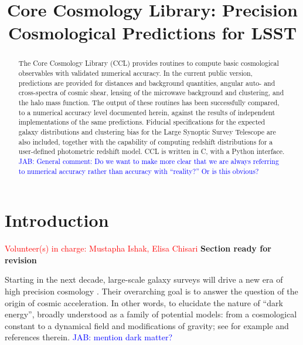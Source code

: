 \documentclass[\docopts]{\docclass}
\newcommand{\vol}[1]{\textcolor{red}{Volunteer(s) in charge: #1}}
\newcommand{\revise}{\textcolor{red!55!blue}{\bf Section ready for revision}}
\newcommand{\jab}[1]{\textcolor{blue}{JAB: #1}}
\begin{document}
\title{Core Cosmology Library: Precision Cosmological Predictions for LSST}

\maketitlepre

\begin{abstract}

The Core Cosmology Library (CCL) provides routines to compute basic cosmological observables with validated numerical accuracy. In the current public version, predictions are provided for distances and background quantities, angular auto- and cross-spectra of cosmic shear, lensing of the microwave background and clustering, and the halo mass function. The output of these routines has been successfully compared, to a numerical accuracy level documented herein, against the results of independent implementations of the same predictions. Fiducial specifications for the expected galaxy distributions and clustering bias for the Large Synoptic Survey Telescope are also included, together with the capability of computing redshift distributions for a user-defined photometric redshift model. CCL is written in C, with a Python interface. 
\jab{General comment: Do we want to make more clear that we are always referring to numerical accuracy rather than accuracy with ``reality?'' Or is this obvious?}

\end{abstract}


\maketitlepost

\newpage
\tableofcontents{}
\newpage



\section{Introduction}
\label{sec:intro}
\vol{Mustapha Ishak, Elisa Chisari}
\revise

Starting in the next decade, large-scale galaxy surveys will drive a new era of high precision cosmology \citep{DESCWhite,green11,Laureijs11}. Their overarching goal is to answer the question of the origin of cosmic acceleration. In other words, to elucidate the nature of ``dark energy'', broadly understood as a family of potential models: from a cosmological constant to a dynamical field and modifications of gravity; see for example  \citep{Carroll2001CC,Peebles2003,
Padmanabhan2003,Copeland2006,Ishak2007,Weinberg13} and references therein. \jab{mention dark matter?} 
\end{document}
